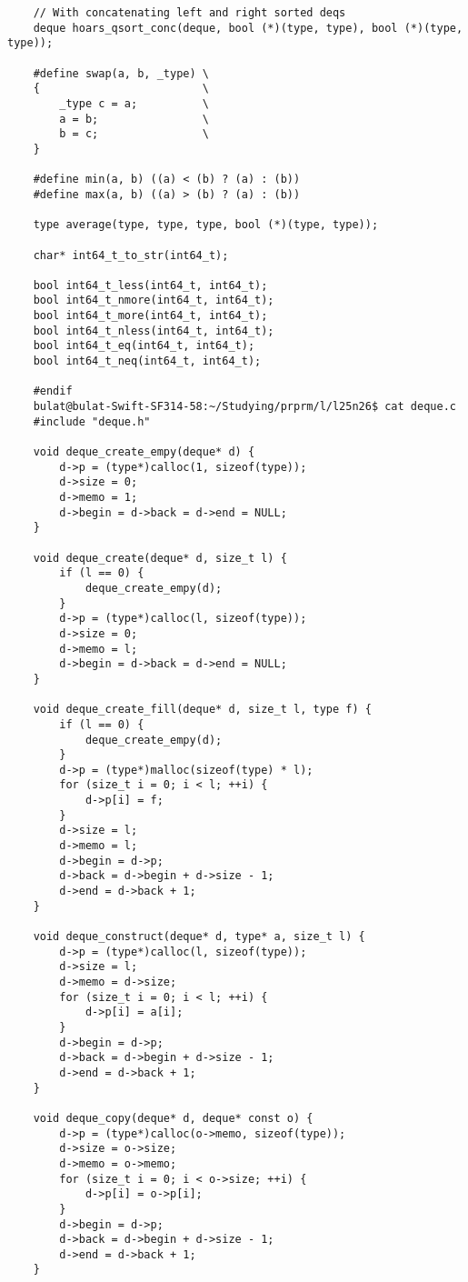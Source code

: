 \documentclass[a4paper]{article}
\newcounter{i}
\begin{document}
\begin{enumerate}[label=\textbf{\arabic*}.]
\begin{verbatim}
    // With concatenating left and right sorted deqs
    deque hoars_qsort_conc(deque, bool (*)(type, type), bool (*)(type, type));
    
    #define swap(a, b, _type) \
    {                         \
        _type c = a;          \
        a = b;                \
        b = c;                \
    }
    
    #define min(a, b) ((a) < (b) ? (a) : (b))
    #define max(a, b) ((a) > (b) ? (a) : (b))
    
    type average(type, type, type, bool (*)(type, type));
    
    char* int64_t_to_str(int64_t);
    
    bool int64_t_less(int64_t, int64_t);
    bool int64_t_nmore(int64_t, int64_t);
    bool int64_t_more(int64_t, int64_t);
    bool int64_t_nless(int64_t, int64_t);
    bool int64_t_eq(int64_t, int64_t);
    bool int64_t_neq(int64_t, int64_t);
    
    #endif
    bulat@bulat-Swift-SF314-58:~/Studying/prprm/l/l25n26$ cat deque.c
    #include "deque.h"
    
    void deque_create_empy(deque* d) {
        d->p = (type*)calloc(1, sizeof(type));
        d->size = 0;
        d->memo = 1;
        d->begin = d->back = d->end = NULL;
    } 
    
    void deque_create(deque* d, size_t l) {
        if (l == 0) {
            deque_create_empy(d);
        }
        d->p = (type*)calloc(l, sizeof(type));
        d->size = 0;
        d->memo = l;
        d->begin = d->back = d->end = NULL;
    }
    
    void deque_create_fill(deque* d, size_t l, type f) {
        if (l == 0) {
            deque_create_empy(d);
        }
        d->p = (type*)malloc(sizeof(type) * l);
        for (size_t i = 0; i < l; ++i) {
            d->p[i] = f;
        }
        d->size = l;
        d->memo = l;
        d->begin = d->p;
        d->back = d->begin + d->size - 1;
        d->end = d->back + 1;
    }
    
    void deque_construct(deque* d, type* a, size_t l) {
        d->p = (type*)calloc(l, sizeof(type));
        d->size = l;
        d->memo = d->size;
        for (size_t i = 0; i < l; ++i) {
            d->p[i] = a[i];
        }
        d->begin = d->p;
        d->back = d->begin + d->size - 1;
        d->end = d->back + 1;
    }
    
    void deque_copy(deque* d, deque* const o) {
        d->p = (type*)calloc(o->memo, sizeof(type));
        d->size = o->size;
        d->memo = o->memo;
        for (size_t i = 0; i < o->size; ++i) {
            d->p[i] = o->p[i];
        }
        d->begin = d->p;
        d->back = d->begin + d->size - 1;
        d->end = d->back + 1;
    }
    

\end{verbatim}
\end{enumerate}
\end{document}
